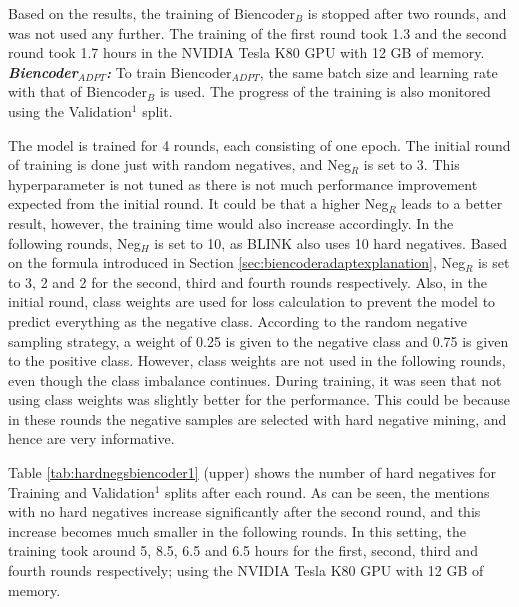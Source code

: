 \documentclass{report}
\theoremstyle{definition}
\theoremstyle{remark}
\begin{document}
Based on the results, the training of Biencoder$_B$ is stopped after two rounds, and was not used any further. The training of the first round took 1.3 and the second round took 1.7 hours in the NVIDIA Tesla K80 GPU with 12 GB of memory.
\newline
\newline
\textit{\textbf{Biencoder}}$_{ADPT}$\textit{\textbf{:}} To train Biencoder$_{ADPT}$, the same batch size and learning rate with that of Biencoder$_{B}$ is used. The progress of the training is also monitored using the Validation$^1$ split. 

The model is trained for 4 rounds, each consisting of one epoch. The initial round of training is done just with random negatives, and Neg$_R$ is set to 3. This hyperparameter is not tuned as there is not much performance improvement expected from the initial round. It could be that a higher Neg$_R$ leads to a better result, however, the training time would also increase accordingly. In the following rounds, Neg$_H$ is set to 10, as BLINK also uses 10 hard negatives. Based on the formula introduced in Section \ref{sec:biencoderadaptexplanation}, Neg$_R$ is set to 3, 2 and 2 for the second, third and fourth rounds respectively. Also, in the initial round, class weights are used for loss calculation to prevent the model to predict everything as the negative class. According to the random negative sampling strategy, a weight of 0.25 is given to the negative class and 0.75 is given to the positive class. However, class weights are not used in the following rounds, even though the class imbalance continues. During training, it was seen that not using class weights was slightly better for the performance. This could be because in these rounds the negative samples are selected with hard negative mining, and hence are very informative.

Table \ref{tab:hardnegsbiencoder1} (upper) shows the number of hard negatives for Training and Validation$^1$ splits after each round. As can be seen, the mentions with no hard negatives increase significantly after the second round, and this increase becomes much smaller in the following rounds. In this setting, the training took around 5, 8.5, 6.5 and 6.5 hours for the first, second, third and fourth rounds respectively; using the NVIDIA Tesla K80 GPU with 12 GB of memory.
\end{document}
